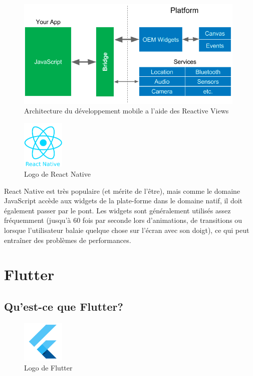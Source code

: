 \begin{figure}[h]
	\begin{center}
		\includegraphics[width=11cm]{Images/chapter2/reactive_views.png}
		\caption{{\footnotesize Architecture du développement mobile a l'aide des Reactive Views\cite{leler_whats_2017}}}
	\end{center}
\end{figure}

\begin{figure}
	\includegraphics[width=2cm]{Images/chapter2/react_native_logo.png}
	\caption{{\footnotesize Logo de React Native}}
\end{figure}

React Native est très populaire (et mérite de l'être), mais comme le domaine JavaScript accède aux widgets de la plate-forme dans le domaine natif, il doit également passer par le pont. Les widgets sont généralement utilisés assez fréquemment (jusqu'à 60 fois par seconde lors d'animations, de transitions ou lorsque l'utilisateur balaie quelque chose sur l'écran avec son doigt), ce qui peut entraîner des problèmes de performances.

\section{Flutter}

\subsection{Qu'est-ce que Flutter?}

\begin{figure}
	\includegraphics[width=2cm]{Images/chapter2/flutter_logo.png}
	\caption{{\footnotesize Logo de Flutter}}
\end{figure}

